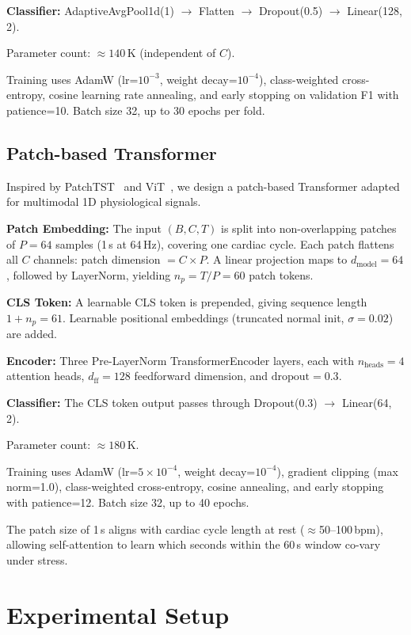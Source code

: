\documentclass[10pt,twocolumn]{article}
\begin{document}
\textbf{Classifier:} AdaptiveAvgPool1d(1) $\to$ Flatten $\to$ Dropout(0.5) $\to$
Linear(128, 2).

Parameter count: $\approx 140$\,K (independent of $C$).

Training uses AdamW (lr=$10^{-3}$, weight decay=$10^{-4}$), class-weighted
cross-entropy, cosine learning rate annealing, and early stopping on
validation F1 with patience=10. Batch size 32, up to 30 epochs per fold.

\subsection{Patch-based Transformer}

Inspired by PatchTST~\cite{nie2023patchtst} and ViT~\cite{dosovitskiy2020vit},
we design a patch-based Transformer adapted for multimodal 1D physiological signals.

\textbf{Patch Embedding:} The input $(B, C, T)$ is split into non-overlapping
patches of $P=64$ samples (1\,s at 64\,Hz), covering one cardiac cycle.
Each patch flattens all $C$ channels: patch dimension $= C \times P$.
A linear projection maps to $d_\text{model}=64$, followed by LayerNorm,
yielding $n_p = T/P = 60$ patch tokens.

\textbf{CLS Token:} A learnable CLS token is prepended,
giving sequence length $1 + n_p = 61$. Learnable positional embeddings
(truncated normal init, $\sigma=0.02$) are added.

\textbf{Encoder:} Three Pre-LayerNorm TransformerEncoder layers, each with
$n_\text{heads}=4$ attention heads, $d_\text{ff}=128$ feedforward dimension,
and $\text{dropout}=0.3$.

\textbf{Classifier:} The CLS token output passes through Dropout(0.3) $\to$
Linear(64, 2).

Parameter count: $\approx 180$\,K.

Training uses AdamW (lr=$5\times10^{-4}$, weight decay=$10^{-4}$), gradient
clipping (max norm=1.0), class-weighted cross-entropy, cosine annealing,
and early stopping with patience=12. Batch size 32, up to 40 epochs.

The patch size of 1\,s aligns with cardiac cycle length at rest ($\approx$50--100\,bpm),
allowing self-attention to learn which seconds within the 60\,s window
co-vary under stress.

\section{Experimental Setup}
\label{sec:setup}
\end{document}
